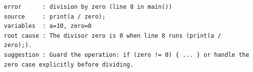 \begin{lstlisting}[]
error      : division by zero (line 8 in main())
source     : print(a / zero);
variables  : a=10, zero=0
root cause : The divisor zero is 0 when line 8 runs (print(a / zero);).
suggestion : Guard the operation: if (zero != 0) { ... } or handle the zero case explicitly before dividing.
\end{lstlisting}
